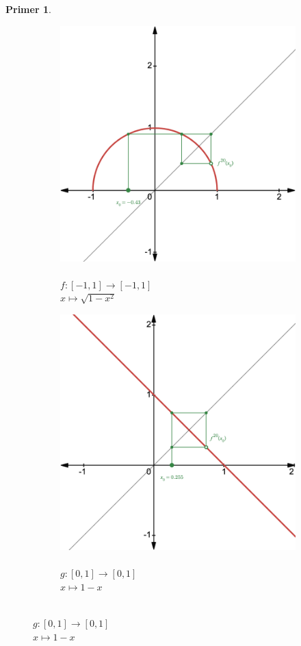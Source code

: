 \documentclass{article}
\newtheorem{primer}{Primer}
\begin{document}
\begin{primer}
\begin{figure}[h]
\begin{subfigure}[b]{0.32\textwidth}
        \includegraphics[width=\textwidth]{Grafi/cobweb132.png}
        \caption{\\$f:[-1, 1] \rightarrow [-1, 1]$ \\ $x\mapsto \sqrt{1 - x^2}$}
        \label{fig:cobweb32}
    \end{subfigure}
    \begin{subfigure}[b]{0.32\textwidth}
        \centering
        \includegraphics[width=\textwidth]{Grafi/cobweb133.png}
        \caption{\\$g:[0,1] \rightarrow [0, 1]$\\ $x\mapsto 1 - x$}
        \label{fig:cobweb33}
    \end{subfigure}
\end{figure}



\end{primer}
\end{document}
